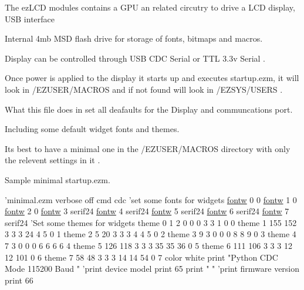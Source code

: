 The ez\-L\-C\-D modules contains a G\-P\-U an related circutry to drive a L\-C\-D display, U\-S\-B interface \par
 Internal 4mb M\-S\-D flash drive for storage of fonts, bitmaps and macros.\par
 Display can be controlled through U\-S\-B C\-D\-C Serial or T\-T\-L 3.\-3v Serial .\par
 \par
 Once power is applied to the display it starts up and executes startup.\-ezm, it will look in /\-E\-Z\-U\-S\-E\-R/\-M\-A\-C\-R\-O\-S and if not found will look in /\-E\-Z\-S\-Y\-S/\-U\-S\-E\-R\-S .\par
 What this file does in set all deafaults for the Display and communcations port.\par
 Including some default widget fonts and themes. \par
 Its best to have a minimal one in the /\-E\-Z\-U\-S\-E\-R/\-M\-A\-C\-R\-O\-S directory with only the relevent settings in it . \par
 \par
 Sample minimal startup.\-ezm. 
\begin{DoxyCodeInclude}
\textcolor{stringliteral}{'minimal.ezm }
\textcolor{stringliteral}{verbose off}
\textcolor{stringliteral}{cmd cdc}
\textcolor{stringliteral}{}
\textcolor{stringliteral}{'}\textcolor{keyword}{set} some fonts \textcolor{keywordflow}{for} widgets
\hyperlink{group___widgets_gad527fa9cb9cda35802e26af7e1870f96}{fontw} 0 0
\hyperlink{group___widgets_gad527fa9cb9cda35802e26af7e1870f96}{fontw} 1 0
\hyperlink{group___widgets_gad527fa9cb9cda35802e26af7e1870f96}{fontw} 2 0
\hyperlink{group___widgets_gad527fa9cb9cda35802e26af7e1870f96}{fontw} 3 serif24
\hyperlink{group___widgets_gad527fa9cb9cda35802e26af7e1870f96}{fontw} 4 serif24
\hyperlink{group___widgets_gad527fa9cb9cda35802e26af7e1870f96}{fontw} 5 serif24
\hyperlink{group___widgets_gad527fa9cb9cda35802e26af7e1870f96}{fontw} 6 serif24
\hyperlink{group___widgets_gad527fa9cb9cda35802e26af7e1870f96}{fontw} 7 serif24
\textcolor{stringliteral}{'Set some themes for widgets}
\textcolor{stringliteral}{theme 0   1   2 0 0 0  3  3   1 0 0}
\textcolor{stringliteral}{theme 1 155 152 3 3 3  24  4   5 0 1}
\textcolor{stringliteral}{theme 2   5  20 3 3 3  4  4   5 0 2}
\textcolor{stringliteral}{theme 3   9   3 0 0 0  8  8   9 0 3}
\textcolor{stringliteral}{theme 4   7   3 0 0 0  6  6   6 6 4}
\textcolor{stringliteral}{theme 5 126 118 3 3 3 35 35  36 0 5}
\textcolor{stringliteral}{theme 6 111 106 3 3 3 12 12 101 0 6}
\textcolor{stringliteral}{theme 7  58  48 3 3 3 14 14  54 0 7}
\textcolor{stringliteral}{}
\textcolor{stringliteral}{color white}
\textcolor{stringliteral}{print "Python CDC Mode 115200 Baud  "}
\textcolor{stringliteral}{'}print device model
print 65
print \textcolor{stringliteral}{"  "}
\textcolor{stringliteral}{'print firmware version}
\textcolor{stringliteral}{print 66}
\end{DoxyCodeInclude}
